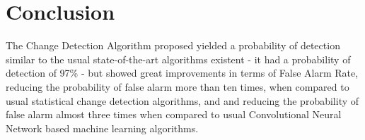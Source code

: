 \section{Conclusion}
The Change Detection Algorithm proposed yielded a probability of detection similar to the usual state-of-the-art algorithms existent - it had a probability of detection of 97\% - 
but showed great improvements in terms of False Alarm Rate, reducing the probability of false alarm more than ten times, when compared to usual statistical change detection algorithms, and 
and reducing the probability of false alarm almost three times when compared to usual Convolutional Neural Network based machine learning algorithms.